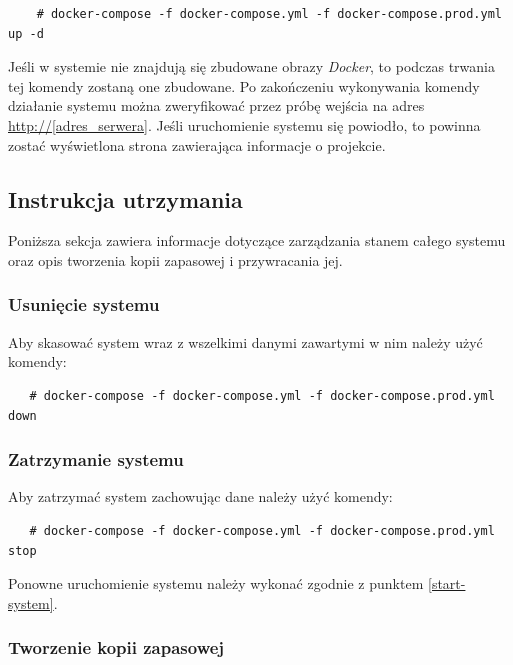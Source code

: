 \documentclass[a4paper,11pt,twoside]{report}
\theoremstyle{definition}
\begin{document}
        \begin{verbatim}
    # docker-compose -f docker-compose.yml -f docker-compose.prod.yml up -d
        \end{verbatim}

        Jeśli w systemie nie znajdują się zbudowane obrazy \textit{Docker}, to podczas trwania tej komendy zostaną one zbudowane.
        Po zakończeniu wykonywania komendy działanie systemu można zweryfikować przez próbę wejścia na adres \url{http://[adres_serwera]}. Jeśli uruchomienie systemu się powiodło, to powinna zostać wyświetlona strona zawierająca informacje o projekcie.

    \subsection{Instrukcja utrzymania}

        Poniższa sekcja zawiera informacje dotyczące zarządzania stanem całego systemu oraz opis tworzenia kopii zapasowej i przywracania jej.

        \subsubsection{Usunięcie systemu}

            Aby skasować system wraz z wszelkimi danymi zawartymi w nim należy użyć komendy:

            \begin{verbatim}
   # docker-compose -f docker-compose.yml -f docker-compose.prod.yml down
            \end{verbatim}


        \subsubsection{Zatrzymanie systemu}

            Aby zatrzymać system zachowując dane należy użyć komendy:
            
            \begin{verbatim}
   # docker-compose -f docker-compose.yml -f docker-compose.prod.yml stop
            \end{verbatim}

            Ponowne uruchomienie systemu należy wykonać zgodnie z punktem \ref{start-system}.

        \subsubsection{Tworzenie kopii zapasowej}
\end{document}
